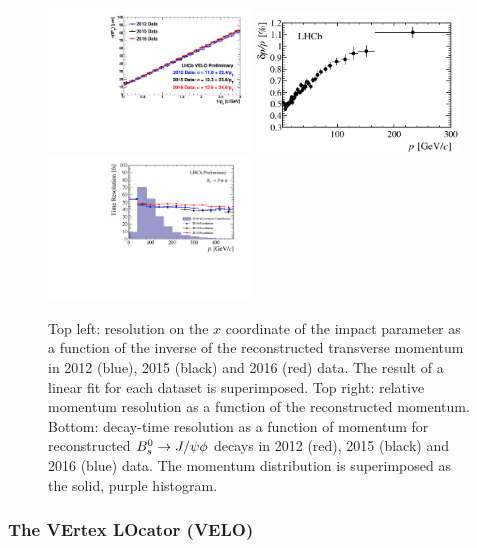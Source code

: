 \begin{figure}[htbp]
  \begin{center}
    \includegraphics[width=0.48\textwidth]{02LHCb/figs/IPX-resolution.pdf}
    \includegraphics[width=0.48\textwidth]{02LHCb/figs/momentum_resolution.png} \\
    \includegraphics[width=0.48\textwidth]{02LHCb/figs/decay_time_res.pdf}
    \vspace{-5mm}
  \end{center}
  \caption{Top left: resolution on the $x$ coordinate of the impact parameter as a function of the inverse of the reconstructed transverse momentum in
  2012 (blue), 2015 (black) and 2016 (red) data. The result of a linear fit for each dataset is superimposed.
  Top right: relative momentum resolution as a function of the reconstructed momentum.
  Bottom: decay-time resolution as a function of momentum for reconstructed $B^0_s\rightarrow J/\psi\phi$ decays in 2012 (red), 2015 (black) and
  2016 (blue) data. The momentum distribution is superimposed as the solid, purple histogram.}
  \label{fig:track_perf}
\end{figure}

\subsubsection*{The VErtex LOcator (VELO)}

